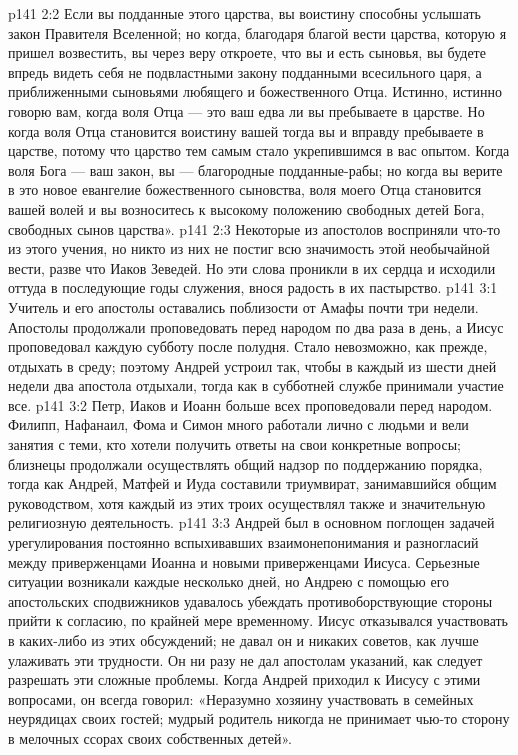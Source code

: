 \vs p141 2:2 Если вы подданные этого царства, вы воистину способны услышать закон Правителя Вселенной; но когда, благодаря благой вести царства, которую я пришел возвестить, вы через веру откроете, что вы и есть сыновья, вы будете впредь видеть себя не подвластными закону подданными всесильного царя, а приближенными сыновьями любящего и божественного Отца. Истинно, истинно говорю вам, когда воля Отца --- это ваш  едва ли вы пребываете в царстве. Но когда воля Отца становится воистину вашей  тогда вы и вправду пребываете в царстве, потому что царство тем самым стало укрепившимся в вас опытом. Когда воля Бога --- ваш закон, вы --- благородные подданные\hyp{}рабы; но когда вы верите в это новое евангелие божественного сыновства, воля моего Отца становится вашей волей и вы возноситесь к высокому положению свободных детей Бога, свободных сынов царства».
\vs p141 2:3 Некоторые из апостолов восприняли что\hyp{}то из этого учения, но никто из них не постиг всю значимость этой необычайной вести, разве что Иаков Зеведей. Но эти слова проникли в их сердца и исходили оттуда в последующие годы служения, внося радость в их пастырство.
\vs p141 3:1 Учитель и его апостолы оставались поблизости от Амафы почти три недели. Апостолы продолжали проповедовать перед народом по два раза в день, а Иисус проповедовал каждую субботу после полудня. Стало невозможно, как прежде, отдыхать в среду; поэтому Андрей устроил так, чтобы в каждый из шести дней недели два апостола отдыхали, тогда как в субботней службе принимали участие все.
\vs p141 3:2 Петр, Иаков и Иоанн больше всех проповедовали перед народом. Филипп, Нафанаил, Фома и Симон много работали лично с людьми и вели занятия с теми, кто хотели получить ответы на свои конкретные вопросы; близнецы продолжали осуществлять общий надзор по поддержанию порядка, тогда как Андрей, Матфей и Иуда составили триумвират, занимавшийся общим руководством, хотя каждый из этих троих осуществлял также и значительную религиозную деятельность.
\vs p141 3:3 Андрей был в основном поглощен задачей урегулирования постоянно вспыхивавших взаимонепонимания и разногласий между приверженцами Иоанна и новыми приверженцами Иисуса. Серьезные ситуации возникали каждые несколько дней, но Андрею с помощью его апостольских сподвижников удавалось убеждать противоборствующие стороны прийти к согласию, по крайней мере временному. Иисус отказывался участвовать в каких\hyp{}либо из этих обсуждений; не давал он и никаких советов, как лучше улаживать эти трудности. Он ни разу не дал апостолам указаний, как следует разрешать эти сложные проблемы. Когда Андрей приходил к Иисусу с этими вопросами, он всегда говорил: «Неразумно хозяину участвовать в семейных неурядицах своих гостей; мудрый родитель никогда не принимает чью\hyp{}то сторону в мелочных ссорах своих собственных детей».
